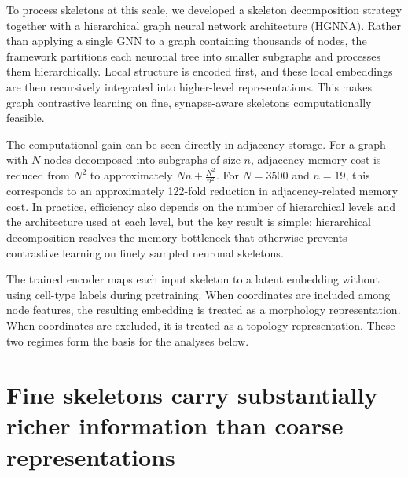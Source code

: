 \documentclass{article}
\begin{document}
To process skeletons at this scale, we developed a skeleton decomposition strategy together with a hierarchical graph neural network architecture (HGNNA). Rather than applying a single GNN to a graph containing thousands of nodes, the framework partitions each neuronal tree into smaller subgraphs and processes them hierarchically. Local structure is encoded first, and these local embeddings are then recursively integrated into higher-level representations. This makes graph contrastive learning on fine, synapse-aware skeletons computationally feasible.

The computational gain can be seen directly in adjacency storage. For a graph with $N$ nodes decomposed into subgraphs of size $n$, adjacency-memory cost is reduced from $N^2$ to approximately $Nn + \frac{N^2}{n^2}$. For $N = 3500$ and $n = 19$, this corresponds to an approximately 122-fold reduction in adjacency-related memory cost. In practice, efficiency also depends on the number of hierarchical levels and the architecture used at each level, but the key result is simple: hierarchical decomposition resolves the memory bottleneck that otherwise prevents contrastive learning on finely sampled neuronal skeletons.

The trained encoder maps each input skeleton to a latent embedding without using cell-type labels during pretraining. When coordinates are included among node features, the resulting embedding is treated as a morphology representation. When coordinates are excluded, it is treated as a topology representation. These two regimes form the basis for the analyses below.

\section{Fine skeletons carry substantially richer information than coarse representations}
\end{document}
